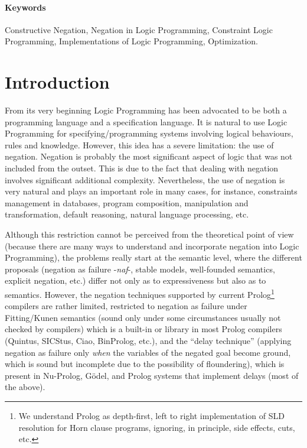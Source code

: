 \documentclass{llncs}
\newcommand{\naf}{{\em naf}}\newcommand{\viejo}[1]{}
\begin{document}
\paragraph{\bf Keywords}
Constructive Negation, Negation in Logic Programming, Constraint Logic
Programming, Implementations of Logic Programming, Optimization.



\section{Introduction}
\label{introduction}
From its very beginning Logic Programming has been advocated to be
both a programming language and a specification language. It is
natural to use Logic Programming for specifying/programming systems
involving logical behaviours, rules and knowledge. However, this idea
has a severe limitation: the use of negation. Negation is probably the
most significant aspect of logic that was not included from the
outset. This is due to the fact that dealing with negation involves
significant additional complexity. Nevertheless, the use of negation
is very natural and plays an important role in many cases, for
instance, constraints management in databases, program composition,
manipulation and transformation, default reasoning, natural language
processing, etc.

Although this restriction cannot be perceived from the theoretical
point of view (because there are many ways to understand and
incorporate negation into Logic Programming), the problems really
start at the semantic level, where the different proposals (negation
as failure -\naf-, stable models, well-founded semantics, explicit
negation, etc.)  differ not only as to expressiveness but also as to
semantics.  However, the negation techniques supported by current
Prolog\footnote{We understand Prolog as depth-first, left to
right implementation of SLD resolution for Horn clause programs,
ignoring, in principle, side effects, cuts, etc.}  compilers are
rather limited, restricted to negation as failure under Fitting/Kunen
semantics \cite{Kunen} (sound only under some circumstances usually
not checked by compilers) which is a built-in or library in most
Prolog compilers (Quintus, SICStus, Ciao, BinProlog, etc.), and the
``delay technique'' (applying negation as failure only \emph{when} the
variables of the negated goal become ground, which is sound but
incomplete due to the possibility of floundering), which is present in
Nu-Prolog, G\"odel, and Prolog systems that implement delays (most of
the above).
\end{document}
